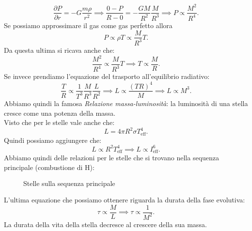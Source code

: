 \[
    \frac{\partial P}{\partial r} = - G \frac{m\rho}{r^2}
    \implies 
    \frac{0-P}{R-0}= -\frac{GM}{R^2}\frac{M}{R^3}
    \implies P \propto \frac{M^2}{R^4}
.\] 
Se possiamo approssimare il gas come gas perfetto allora 
\[
P\propto\rho T\propto \frac{M}{R^3}T
.\] 
Da questa ultima si ricava anche che:
\[
    \frac{M^2}{R^4}\propto \frac{M}{R^3}T \implies T \propto \frac{M}{R}
.\] 
Se invece prendiamo l'equazione del trasporto all'equilibrio radiativo:
\[
    \frac{T}{R}\propto \frac{1}{T^3}\frac{M}{R^3}\frac{L}{R^2}
    \implies L\propto \frac{\left(TR\right)^4}{M} \implies
    L \propto M^3
.\] 
Abbiamo quindi la famosa \textit{Relazione massa-luminosità}: la luminosità di una stella cresce come una potenza della massa.\\
Visto che per le stelle vale anche che:
\[
    L=4\pi R^2\sigma T_\text{eff}^4
.\] 
Quindi possiamo aggiungere che:
\[
    L\propto R^2T^4_\text{eff} \implies L\propto I_\text{eff}^6
.\] 
Abbiamo quindi delle relazioni per le stelle che si trovano nella sequenza principale (combustione di H):
\begin{figure}[H]
    \centering
    \caption{Stelle sulla sequenza principale}
    \label{fig:stelle-sulla-sequenza-principale}
\end{figure}
L'ultima equazione che possiamo ottenere riguarda la durata della fase evolutiva:
\[
    \tau  \propto  \frac{M}{L} \implies \tau  \propto  \frac{1}{M^2}	
.\] 
La durata della vita della stella decresce al crescere della sua massa.

